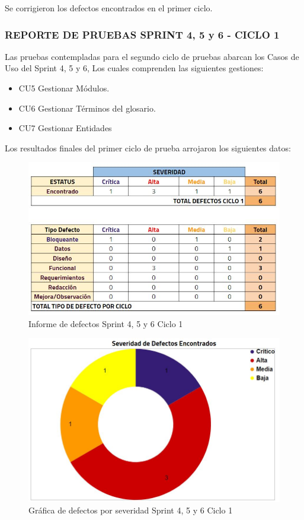 Se corrigieron los defectos encontrados en el primer ciclo.
\newpage

\subsubsection{REPORTE DE PRUEBAS SPRINT 4, 5 y 6 - CICLO 1}
Las pruebas contempladas para el segundo ciclo de pruebas abarcan los Casos de Uso del Sprint 4, 5 y 6, Los cuales comprenden las siguientes gestiones:

\begin{itemize}
	\item CU5 Gestionar Módulos.
	\item CU6 Gestionar Términos del glosario.
	\item CU7 Gestionar Entidades
\end{itemize}

Los resultados finales del primer ciclo de prueba arrojaron los siguientes datos:

\begin{figure}[H]
	\begin{center}
		\includegraphics[width=.95\textwidth]{images/pruebas/s4c2}
		\caption{Informe de defectos Sprint 4, 5 y 6  Ciclo 1}
		\label{fig:infos4c2}
	\end{center}
\end{figure}

\begin{figure}[H]
	\begin{center}
		\includegraphics[width=.65\textwidth]{images/pruebas/s4c2-1}
		\caption{Gráfica de defectos por severidad Sprint 4, 5 y 6  Ciclo 1}
		\label{fig:infos4c2-1}
	\end{center}
\end{figure}


